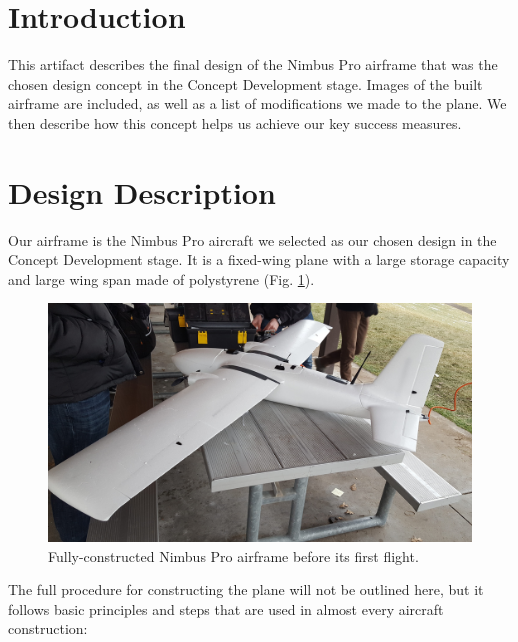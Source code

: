 \documentclass[]{auvsi_doc}
\begin{document}
\begin{AUVSITitlePage}
\begin{artifacttable}
\end{artifacttable}
\end{AUVSITitlePage}

\section{Introduction}
This artifact describes the final design of the Nimbus Pro airframe that was the chosen design concept in the Concept Development stage. Images of the built airframe are included, as well as a list of modifications we made to the plane. We then describe how this concept helps us achieve our key success measures.

\section{Design Description}
Our airframe is the Nimbus Pro aircraft we selected as our chosen design in the Concept Development stage. It is a fixed-wing plane with a large storage capacity and large wing span made of polystyrene (Fig. \ref{fig:plane1}).

\begin{figure}[h!]
	\centering
	\includegraphics[width=.9\columnwidth]{plane1}
	\caption{Fully-constructed Nimbus Pro airframe before its first flight.}
	\label{fig:plane1}
\end{figure} 

The full procedure for constructing the plane will not be outlined here, but it follows basic principles and steps that are used in almost every aircraft construction:
\end{document}
